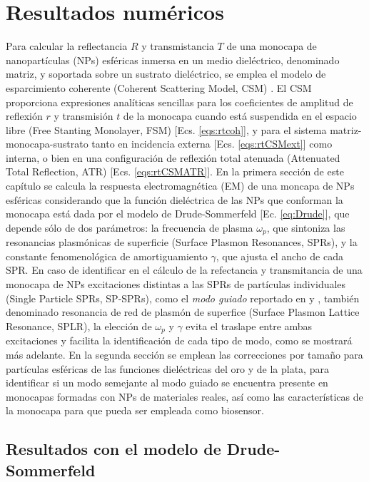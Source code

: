 \chapter{Resultados numéricos}
\label{chapter:Resultados}

Para calcular la reflectancia $R$ y transmistancia $T$  de una monocapa de nanopartículas (NPs) esféricas inmersa en un medio dieléctrico, denominado matriz, y soportada sobre un sustrato dieléctrico, se emplea el modelo de esparcimiento coherente (Coherent Scattering Model, CSM) \cite{reyes2018analytical,garcia2012multiple}. El CSM proporciona expresiones analíticas sencillas para los coeficientes de amplitud de reflexión $r$ y transmisión $t$ de la monocapa cuando está suspendida en el espacio libre (Free Stanting Monolayer, FSM) [Ecs. \eqref{eqs:rtcoh}], y para el sistema matriz-monocapa-sustrato tanto en incidencia externa [Ecs. \eqref{eqs:rtCSMext}] como interna, o bien en una configuración de reflexión total atenuada  (Attenuated Total Reflection, ATR) [Ecs. \eqref{eqs:rtCSMATR}]. En la primera sección de este capítulo se calcula la respuesta electromagnética (EM) de una moncapa de NPs esféricas considerando que la función dieléctrica de las NPs que conforman la monocapa está dada por el modelo de Drude-Sommerfeld [Ec. \eqref{eq:Drude}], que depende sólo de dos parámetros: la frecuencia de plasma $\omega_p$, que sintoniza las resonancias plasmónicas de superficie (Surface Plasmon Resonances, SPRs), y la constante fenomenológica de amortiguamiento $\gamma$, que ajusta el ancho de cada SPR. En caso de identificar en el cálculo de la refectancia y transmitancia de una monocapa de NPs excitaciones distintas a las  SPRs de partículas individuales (Single Particle SPRs, SP-SPRs), como el \emph{modo guiado} reportado en \cite{kabashin2009plasmonic} y \cite{danilov2018ultra}, también denominado resonancia de red de plasmón de superfice (Surface Plasmon Lattice Resonance, SPLR), la elección de $\omega_p$ y $\gamma$ evita el traslape entre ambas excitaciones y facilita la identificación de cada tipo de modo, como se mostrará más adelante. En la segunda sección se emplean las correcciones por tamaño para partículas esféricas de las funciones dieléctricas del oro y de la plata, para identificar si un modo semejante al modo guiado se encuentra presente en monocapas formadas con NPs de materiales reales, así como las  características de la monocapa para que pueda ser empleada como biosensor.

\section{Resultados con el modelo de Drude-Sommerfeld}
\label{section:Drude}


